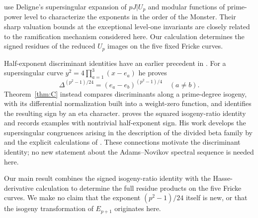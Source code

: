 \documentclass[11pt,a4paper]{article}
\numberwithin{equation}{section}
\theoremstyle{definition}
\theoremstyle{remark}
\begin{document}
\citet[Proposition~3.1 and \S4]{DS26} use Deligne's
supersingular expansion of $pJ|U_p$ and modular functions of prime-power level
to characterize the exponents in the order of the Monster. Their sharp
valuation bounds at the exceptional level-one invariants are closely related
to the ramification mechanism considered here. Our calculation determines the
signed residues of the reduced $U_p$ images on the five fixed Fricke curves.

Half-exponent discriminant identities have an earlier precedent in
\citet[Theorem~3, p.~72; \S4]{Landweber88}. For a supersingular curve
$y^2=4\prod_{a=1}^3(x-e_a)$ he proves
\[
\Delta^{(p^2-1)/24}=(e_a-e_b)^{(p^2-1)/4}\quad(a\ne b).
\]
Theorem~\ref{thm:C} instead compares discriminants along a prime-degree isogeny,
with its differential normalization built into a weight-zero function, and identifies
the resulting sign by an eta character. \citet[Theorem~1.2 and Remark~4]{Ono25}
proves the squared isogeny-ratio identity and records examples with nontrivial
half-exponent sign. His work develops the supersingular congruences arising in
the description of the divided beta family by \citet[Theorem~1.2]{Behrens09}
and the explicit calculations of \citet[\S5.4, Conjecture~5.17]{Larson20}.
These connections motivate the discriminant identity; no new statement about the
Adams--Novikov spectral sequence is needed here.

Our main result combines the signed isogeny-ratio identity with the Hasse-derivative
calculation to determine the full residue products on the five Fricke curves.
We make no claim that the exponent $(p^2-1)/24$ itself is new, or that the
isogeny transformation of $E_{p+1}$ originates here.
\end{document}
